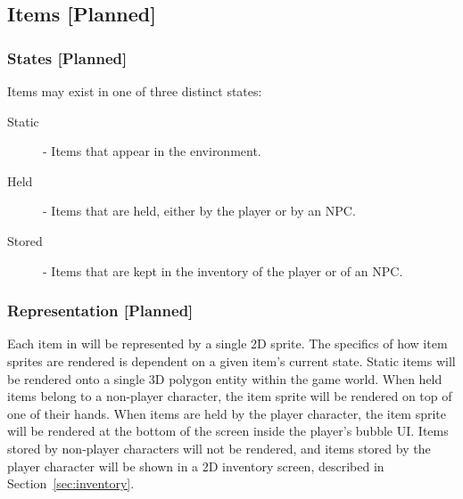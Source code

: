 \documentclass{GlobalDocument}
\begin{document}
\subsection{Items [Planned]}
\subsubsection{States [Planned]}

Items may exist in one of three distinct states:
\begin{description}
\item[Static]{- Items that appear in the environment.}
\item[Held]{- Items that are held, either by the player or by an NPC.}
\item[Stored]{- Items that are kept in the inventory of the player or of an NPC.}
\end{description}

\subsubsection{Representation [Planned]}
Each item in \ourgame{} will be represented by a single 2D sprite. The specifics of how item sprites are rendered is dependent on a given item's current state. Static items will be rendered onto a single 3D polygon entity within the game world. When held items belong to a non-player character, the item sprite will be rendered on top of one of their hands. When items are held by the player character, the item sprite will be rendered at the bottom of the screen inside the player's bubble UI. Items stored by non-player characters will not be rendered, and items stored by the player character will be shown in a 2D inventory screen, described in Section~\ref{sec:inventory}. 
\end{document}
